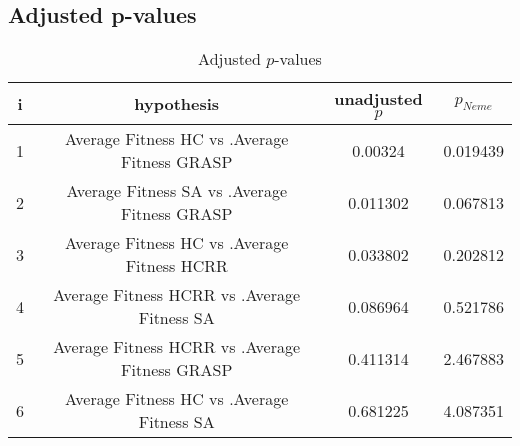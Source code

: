 \documentclass[a4paper,10pt]{article}
\begin{document}
\begin{landscape}
\pagebreak

\subsection{Adjusted p-values}

\begin{table}[!htp]
\centering\scriptsize
\begin{tabular}{cccc}
i&hypothesis&unadjusted $p$&$p_{Neme}$\\
\hline1&Average Fitness HC       vs .Average Fitness GRASP&0.00324&0.019439\\
2&Average Fitness SA      vs .Average Fitness GRASP&0.011302&0.067813\\
3&Average Fitness HC       vs .Average Fitness HCRR   &0.033802&0.202812\\
4&Average Fitness HCRR    vs .Average Fitness SA     &0.086964&0.521786\\
5&Average Fitness HCRR    vs .Average Fitness GRASP&0.411314&2.467883\\
6&Average Fitness HC       vs .Average Fitness SA     &0.681225&4.087351\\
\hline
\end{tabular}
\caption{Adjusted $p$-values}
\end{table}

\end{landscape}
\end{document}
